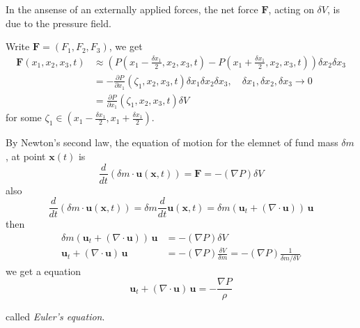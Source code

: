 In the ansense of an externally applied forces, the net force $\textbf{F}$, acting on $\delta V$, is due to the pressure field.

Write $\textbf{F}=(F_1,F_2,F_3)$, we get
\begin{equation}
\begin{aligned}
\textbf{F}(x_1,x_2,x_3,t)
&\approx \left(
P\left(x_1-\frac{\delta x_1}{2},x_2,x_3,t\right)
- P\left(x_1+\frac{\delta x_1}{2},x_2,x_3,t\right)
\right)\delta x_2 \delta x_3\\
&= -\frac{\partial P}{\partial x_1}(\zeta_{1},x_2,x_3, t)\delta x_1 \delta x_2 \delta x_3,\quad \delta x_1, \delta x_2, \delta x_3\to 0\\
&= \frac{\partial P}{\partial x_1}(\zeta_{1},x_2,x_3, t)\delta V
\end{aligned}
\end{equation}
for some $\zeta_1\in\left(x_1-\frac{\delta x_1}{2}, x_1+\frac{\delta x_1}{2}\right)$.

By Newton's second law, the equation of motion for the elemnet of fund mass $\delta m$, at point $\textbf{x}(t)$ is 
\begin{equation}
\frac{d}{dt}\left(\delta m \cdot \textbf{u}(\textbf{x},t)\right) = \textbf{F} = -(\nabla P)\delta V
\end{equation}
also
\begin{equation}
\frac{d}{dt}\left(\delta m \cdot \textbf{u}(\textbf{x},t)\right) = \delta m \frac{d}{dt}\textbf{u}(\textbf{x},t) = \delta m \left(\textbf{u}_t+(\nabla\cdot \textbf{u})\right)\,\textbf{u}
\end{equation}
then
\begin{equation}
\begin{aligned}
\delta m \left(\textbf{u}_t+(\nabla\cdot \textbf{u})\right) \,\textbf{u}
&=
-(\nabla P)\delta V\\
\textbf{u}_t+ (\nabla\cdot \textbf{u})\,\textbf{u} &= -(\nabla P)\frac{\delta V}{\delta m} = -(\nabla P)\frac{1}{\delta m/\delta V}
\end{aligned}
\end{equation}
we get a equation
\begin{equation}
\textbf{u}_t+ (\nabla\cdot \textbf{u}) \,\textbf{u} = -\frac{\nabla P}{\rho}
\end{equation}


called \textit{Euler's equation}.

